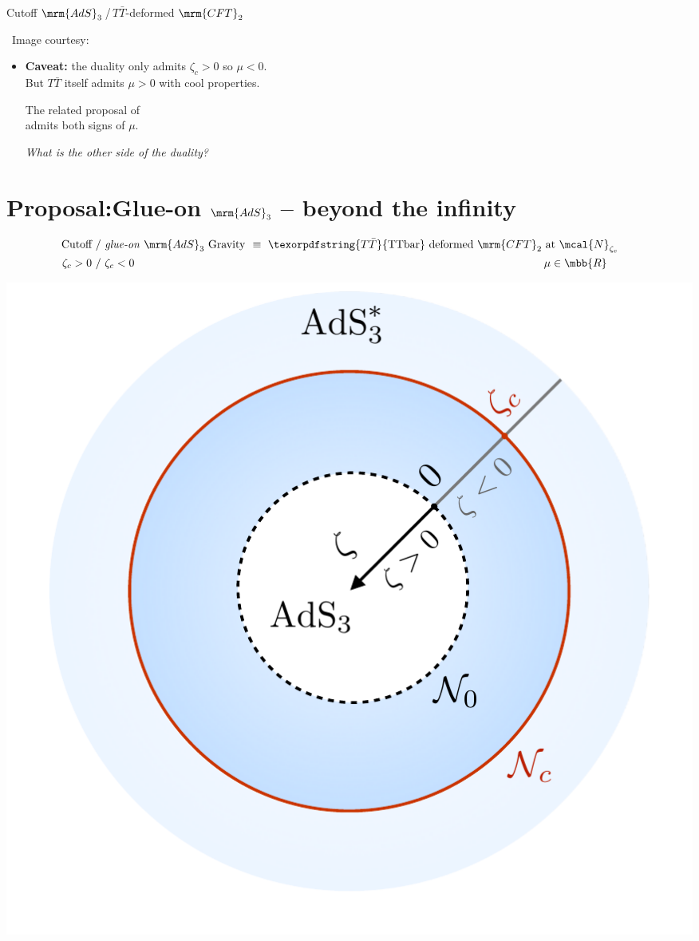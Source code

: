 \documentclass[10pt]{article}
\newcommand{\citations}[1]{{\footnotesize#1\par}}
\newcommand{\TTbar}{\texorpdfstring{\ensuremath{T\bar{T}}}{TTbar}\xspace}
\begin{document}
\begin{multicols}{3}
\begin{center}
	\vspace{-.5\baselineskip}\small
	Cutoff $\mrm{AdS}_3$\,/\,\TTbar-deformed $\mrm{CFT}_2$

	\vspace{-.2\baselineskip}
	\scriptsize\ Image courtesy: \textcite{AldegundePWSep22}
\end{center}


\begin{itemize}

\item[] \textbf{Caveat:} the duality only admits $\zeta_c > 0$ so $\mu < 0$.\\
But \TTbar itself admits $\mu > 0$ with cool properties.

\citations{The related proposal of \textcite{Guica:2019nzm}\\
admits both signs of $\mu$.}

\textit{What is the other side of the duality?}

\end{itemize}

\vspace{-\baselineskip}

\section*{\textbf{Proposal:}\texstringonly{\\}Glue-on $\mrm{AdS}_3$ -- beyond the infinity}
\label{se:glueonproposal}

\parbox{\linewidth}{
\vspace{-\baselineskip}
\textbf{\begin{equation*}
\hspace{-1.8em}
\begin{aligned}
	\textrm{Cutoff}
	\ &/\ %
	\text{\textit{glue-on} $\mrm{AdS}_3$ Gravity}
	\!\!&\equiv\ %
	\textrm{\TTbar deformed $\mrm{CFT}_2$ at $\mcal{N}_{\zeta_c}$} \\
	\zeta_c > 0
	\ &/\ %
	\zeta_c < 0
	& \mu \in \mbb{R}\quad
\end{aligned}
\end{equation*}}
\begin{center}
	\vspace{-1\baselineskip}%
	\centering
	\includegraphics[width=.6\linewidth]{img/diagram.pdf}
	

\end{center}}
\end{multicols}
\end{document}
